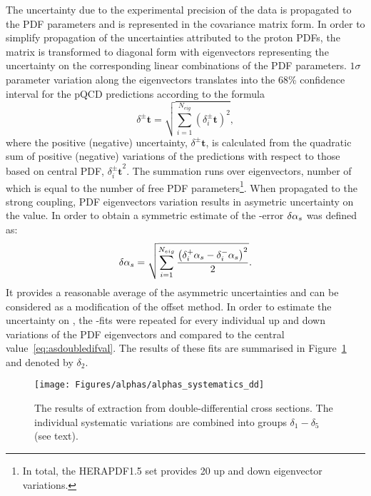 The uncertainty due to the experimental precision of the data is propagated to the PDF parameters and is represented in the covariance matrix form. In order to simplify propagation of the uncertainties attributed to the proton PDFs, the matrix is transformed to diagonal form with eigenvectors representing the uncertainty on the corresponding linear combinations of the PDF parameters. $1\sigma$ parameter variation along the eigenvectors translates into the 68\% confidence interval for the pQCD predictions according to the formula~\cite{Campbell:2006wx}
\begin{equation}
 \delta^{\pm}\mathbf{t} = \sqrt{\sum_{i=1}^{N_{eig}}{\left(\mbox{$\delta_i^{\pm}\mathbf{t}$}\right)^2}},
 \label{eq:mastereq}
\end{equation}
where the positive (negative) uncertainty, $\delta^{\pm}\mathbf{t}$, is calculated from the quadratic sum of positive (negative) variations of the predictions with respect to those based on central PDF, $\mbox{$\delta_i^{\pm}\mathbf{t}$}^2$. The summation runs over eigenvectors, number of which is equal to the number of free PDF parameters\footnote{In total, the HERAPDF1.5 set provides 20 up and down eigenvector variations.}. When propagated to the strong coupling, PDF eigenvectors variation results in asymetric uncertainty on the \as value. In order to obtain a symmetric estimate of the \as-error $\delta\mbox{$\alpha_{s}$}$ was defined as:
\begin{equation}
 \delta\mbox{$\alpha_{s}$} = \sqrt{\sum_{i=1}^{N_{eig}}{\frac{\left(\mbox{$\delta_i^{+}\mbox{$\alpha_{s}$}$} - \mbox{$\delta_i^{-}\mbox{$\alpha_{s}$}$}\right)^2}{2}}}.
 \label{eq:mastereqsym}
\end{equation}
It provides a reasonable average of the asymmetric uncertainties and can be considered as a modification of the offset method. In order to estimate the uncertainty on \asz, the \as-fits were repeated for every individual up and down variations of the PDF eigenvectors and compared to the central value~\ref{eq:asdoubledifval}. The results of these fits are summarised in Figure~\ref{fig:asthunc_dd} and denoted by $\delta_2$.
\begin{landscape}
\begin{figure}[p]
 \centering
 \caption{The results of \asz extraction from double-differential cross sections. The individual systematic variations are combined into groups $\delta_1-\delta_5$ (see text).}
 \label{fig:asthunc_dd}
 \texttt{[image: Figures/alphas/alphas\_systematics\_dd]}
\end{figure}
\end{landscape}

